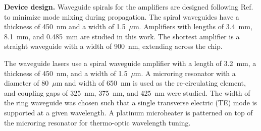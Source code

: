 \documentclass[amsmath, amsthm, amssymb, aps, prb, superscriptaddress, twocolumn, nofootinbib, 10pt]{revtex4-1}%
\begin{document}
\noindent\textbf{Device design.} Waveguide spirals for the amplifiers are designed following Ref. \cite{Chen:12} to minimize mode mixing during propagation. The spiral waveguides have a thickness of 450~nm and a width of 1.5~$\mu$m. Amplifiers with lengths of 3.4~mm, 8.1~mm, and 0.485~mm are studied in this work. The shortest amplifier is a straight waveguide with a width of 900~nm, extending across the chip.

The waveguide lasers use a spiral waveguide amplifier with a length of 3.2~mm, a thickness of 450~nm, and a width of 1.5~$\mu$m. A microring resonator with a diameter of 80~$\mu$m and width of 650~nm is used as the re-circulating element, and coupling gaps of 325~nm, 375~nm, and 425~nm were studied. The width of the ring waveguide was chosen such that a single transverse electric (TE) mode is supported at a given wavelength. A platinum microheater is patterned on top of the microring resonator for thermo-optic wavelength tuning. 
\newline
\end{document}
